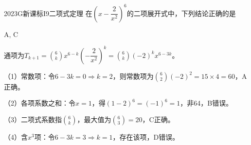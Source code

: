 
\begin{problem}{2023}{G}{新课标I}{9}{二项式定理}
在$\left(x-\dfrac{2}{x^2}\right)^6$的二项展开式中，下列结论正确的是
\begin{choices}
\end{choices}
\end{problem}

\begin{answer}
A, C
\end{answer}

\begin{solutions}
通项为$T_{k+1}=\binom{6}{k}x^{6-k}\left(-\dfrac{2}{x^2}\right)^k=\binom{6}{k}(-2)^k x^{6-3k}$。

（1）常数项：令$6-3k=0\Rightarrow k=2$，则常数项为$\binom{6}{2}(-2)^2=15\times4=60$，A正确。

（2）各项系数之和：令$x=1$，得$(1-2)^6=(-1)^6=1$，非64，B错误。

（3）二项式系数指$\binom{6}{k}$，最大值为$\binom{6}{3}=20$，C正确。

（4）含$x^3$项：令$6-3k=3\Rightarrow k=1$，存在该项，D错误。
\end{solutions}